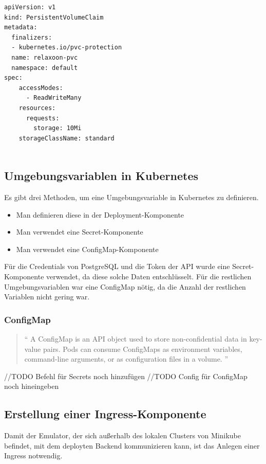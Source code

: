 \begin{lstlisting}[caption=PVC.yml]
apiVersion: v1
kind: PersistentVolumeClaim
metadata:
  finalizers:
  - kubernetes.io/pvc-protection
  name: relaxoon-pvc
  namespace: default
spec:
    accessModes:
      - ReadWriteMany
    resources:
      requests:
        storage: 10Mi
    storageClassName: standard
    
\end{lstlisting}


\subsection{Umgebungsvariablen in Kubernetes}
Es gibt drei Methoden, um eine Umgebungsvariable in Kubernetes zu definieren.

\begin{itemize}
  \item Man definieren diese in der Deployment-Komponente
  \item Man verwendet eine Secret-Komponente
  \item Man verwendet eine ConfigMap-Komponente
\end{itemize} \cite{envs-k8s}

Für die Credentials von PostgreSQL und die Token der API wurde eine Secret-Komponente verwendet, da diese solche Daten entschlüsselt.
Für die restlichen Umgebungsvariablen war eine ConfigMap nötig, da die Anzahl der restlichen Variablen nicht gering war. \cite{secrets}

\subsubsection{ConfigMap}

\begin{quotation}
  ``
  A ConfigMap is an API object used to store non-confidential
  data in key-value pairs. Pods can consume ConfigMaps as environment variables,
  command-line arguments, or as configuration files in a volume.
  \cite{config-maps}
  ''
\end{quotation}
//TODO Befehl für Secrets noch hinzufügen
//TODO Config für ConfigMap noch hineingeben

\subsection{Erstellung einer Ingress-Komponente}

Damit der Emulator, der sich außerhalb des lokalen Clusters von Minikube befindet,
mit dem deployten Backend kommunizieren kann,
ist das Anlegen einer Ingress notwendig.

